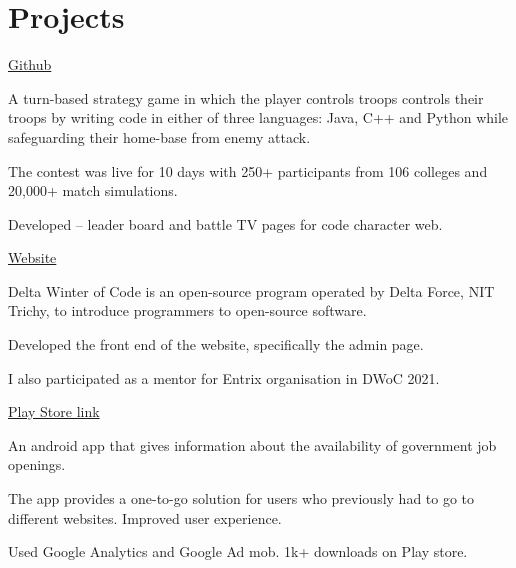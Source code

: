 \documentclass[]{deedy-resume-openfont}
\begin{document}
\begin{minipage}[t]{0.69\textwidth}
\section{Projects}
\raggedright

\hfill \href{https://github.com/delta/codecharacter-web-2022}{Github}\\
\begin{tightemize}
    \item A turn-based strategy game in which the player controls troops controls their troops by writing code in either of three languages: Java, C++ and Python while safeguarding their home-base from enemy attack.
	\item   The contest was live for 10 days with 250+ participants from 106 colleges and 20,000+ match simulations. 
    \item Developed – leader board and battle TV pages for code character web.
\end{tightemize}
\sectionsep

\hfill \href{http://dwoc.io}{Website}\\
\begin{tightemize}
    \item Delta Winter of Code is an open-source program operated by Delta Force, NIT Trichy, to introduce programmers to open-source software.
    \item Developed the front end of the website, specifically the admin page.
	\item  I also participated as a mentor for Entrix organisation in DWoC 2021.
\end{tightemize}
\sectionsep

\hfill \href{https://play.google.com/store/apps/details?id=com.amostrone.akash.sanjeevwebsolutions}{Play Store link}\\
\begin{tightemize}
    \item An android app that gives information about the availability of government job openings.
    \item The app provides a one-to-go solution for users who previously had to go to different websites. Improved user experience.
	\item   Used Google Analytics and Google Ad mob. 1k+ downloads on Play store.
\end{tightemize}
\sectionsep


\end{minipage}
\end{document}
